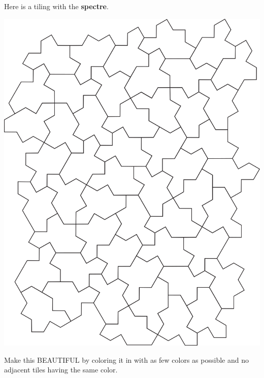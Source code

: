 \documentclass[noauthor,nooutcomes,handout,hints,12pt]{ximera}
\begin{document}
\begin{question}
  Here is a tiling with the \textbf{spectre}.
  \begin{center}
    \includegraphics[scale=.9]{spectre.png}
  \end{center}
  Make this BEAUTIFUL by coloring it in with as few colors as possible
  and no adjacent tiles having the same color.
\end{question}
\end{document}

